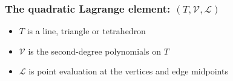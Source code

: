 \begin{frame}
  \frametitle{The quadratic Lagrange element: $(T, \mathcal{V}, \mathcal{L})$}

  \begin{itemize}
  \item
    $T$ is a line, triangle or tetrahedron
  \item
    $\mathcal{V}$ is the second-degree polynomials on $T$
  \item
    $\mathcal{L}$ is point evaluation at the vertices and edge midpoints
  \end{itemize}

\end{frame}
